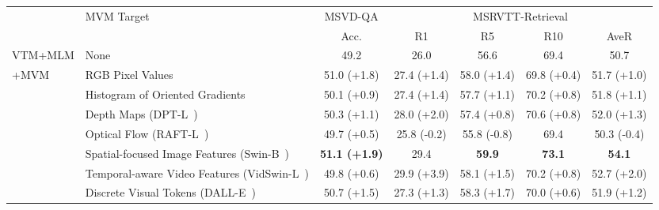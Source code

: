 \documentclass[10pt,twocolumn,letterpaper]{article}
\newlength\savewidth
\newcommand\shline{\noalign{\global\savewidth\arrayrulewidth\global\arrayrulewidth 1pt}\hline\noalign{\global\arrayrulewidth\savewidth}}
\newcommand{\tablestyle}[2]{\setlength{\tabcolsep}{#1}\renewcommand{\arraystretch}{#2}\centering\footnotesize}
\begin{document}
\begin{table*}[t]
\centering
    \tablestyle{6pt}{1.1} 
    \def \w{20pt} 
\begin{tabular}{ll| ccccc}
        \shline
        \multirow{2}{*}{Pre-training Tasks} & \multirow{2}{*}{MVM Target} & MSVD-QA & \multicolumn{4}{c}{MSRVTT-Retrieval} \\
        \cmidrule(lr){3-3}\cmidrule(lr){4-7}
         &  & Acc. & R1 & R5 & R10 & AveR \\
        \hline
VTM+MLM & None &  49.2  &  26.0 & 56.6 & 69.4 & 50.7\\
        \hline
        \multirow{7}{*}{+MVM} & RGB Pixel Values & 51.0 {\color{ForestGreen}(+1.8)}  & 27.4 {\color{ForestGreen}(+1.4)} & 58.0 {\color{ForestGreen}(+1.4)}& 69.8 {\color{ForestGreen}(+0.4)} & 51.7 {\color{ForestGreen}(+1.0)}\\
          & Histogram of Oriented Gradients~\cite{dalal2005hog} & 50.1 {\color{ForestGreen}(+0.9)} & 27.4 {\color{ForestGreen}(+1.4)} & 57.7 {\color{ForestGreen}(+1.1)}& 70.2 {\color{ForestGreen}(+0.8)} & 51.8 {\color{ForestGreen}(+1.1)}\\
          \cline{2-7} 
        & Depth Maps (DPT-L~\cite{ranftl2021dpt}) & 50.3 {\color{ForestGreen}(+1.1)}  & 28.0 {\color{ForestGreen}(+2.0)} & 57.4 {\color{ForestGreen}(+0.8)}& 70.6 {\color{ForestGreen}(+0.8)} & 52.0 {\color{ForestGreen}(+1.3)}\\
         & Optical Flow (RAFT-L~\cite{teed2020raft}) & 49.7 {\color{ForestGreen}(+0.5)}  & 25.8 {\color{BrickRed}(-0.2)} & 55.8 {\color{BrickRed}(-0.8)}& 69.4  & 50.3 {\color{BrickRed}(-0.4)}\\
         \cline{2-7} 
         \rowcolor{lightgray}
          & Spatial-focused Image Features (Swin-B~\cite{liu2021swin}) & \textbf{51.1 {\color{ForestGreen}(+1.9)}} &  29.4 \space {\color{ForestGreen}(+3.4)} & \textbf{59.9 \space {\color{ForestGreen} (+3.6)}} & \textbf{73.1 \space {\color{ForestGreen}(+3.7)}} & \textbf{54.1 \space {\color{ForestGreen}(+3.4)}} \\
& Temporal-aware Video Features (VidSwin-L~\cite{liu2022video-swin}) & 49.8 {\color{ForestGreen}(+0.6)} &  29.9 {\color{ForestGreen}(+3.9)} &  58.1 {\color{ForestGreen}(+1.5)} &  70.2 {\color{ForestGreen}(+0.8)} &  52.7 {\color{ForestGreen}(+2.0)} \\
\cline{2-7}
         & Discrete Visual Tokens (DALL-E~\cite{ramesh2021dalle}) & 50.7 {\color{ForestGreen}(+1.5)} & 27.3 {\color{ForestGreen}(+1.3)} & 58.3 {\color{ForestGreen}(+1.7)} & 70.0 {\color{ForestGreen}(+0.6)} & 51.9 {\color{ForestGreen}(+1.2)} \\

\end{tabular}
\end{table*}
\end{document}
